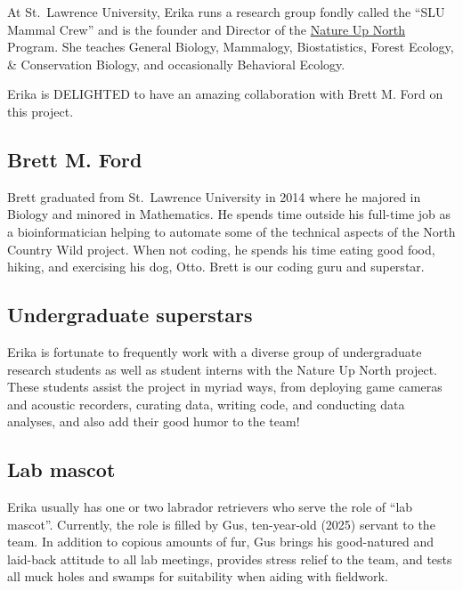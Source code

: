 \documentclass[
  letterpaper,
  DIV=11,
  numbers=noendperiod]{scrreprt}
\begin{document}
At St.~Lawrence University, Erika runs a research group fondly called
the ``SLU Mammal Crew'' and is the founder and Director of the
\href{https://www.natureupnorth.org}{Nature Up North} Program. She
teaches General Biology, Mammalogy, Biostatistics, Forest Ecology, \&
Conservation Biology, and occasionally Behavioral Ecology.

Erika is DELIGHTED to have an amazing collaboration with Brett M. Ford
on this project.

\subsection*{Brett M. Ford}\label{brett-m.-ford}

Brett graduated from St.~Lawrence University in 2014 where he majored in
Biology and minored in Mathematics. He spends time outside his full-time
job as a bioinformatician helping to automate some of the technical
aspects of the North Country Wild project. When not coding, he spends
his time eating good food, hiking, and exercising his dog, Otto. Brett
is our coding guru and superstar.

\subsection*{Undergraduate superstars}\label{undergraduate-superstars}

Erika is fortunate to frequently work with a diverse group of
undergraduate research students as well as student interns with the
Nature Up North project. These students assist the project in myriad
ways, from deploying game cameras and acoustic recorders, curating data,
writing code, and conducting data analyses, and also add their good
humor to the team!

\subsection*{Lab mascot}\label{lab-mascot}

Erika usually has one or two labrador retrievers who serve the role of
``lab mascot''. Currently, the role is filled by Gus, ten-year-old
(2025) servant to the team. In addition to copious amounts of fur, Gus
brings his good-natured and laid-back attitude to all lab meetings,
provides stress relief to the team, and tests all muck holes and swamps
for suitability when aiding with fieldwork.
\end{document}
